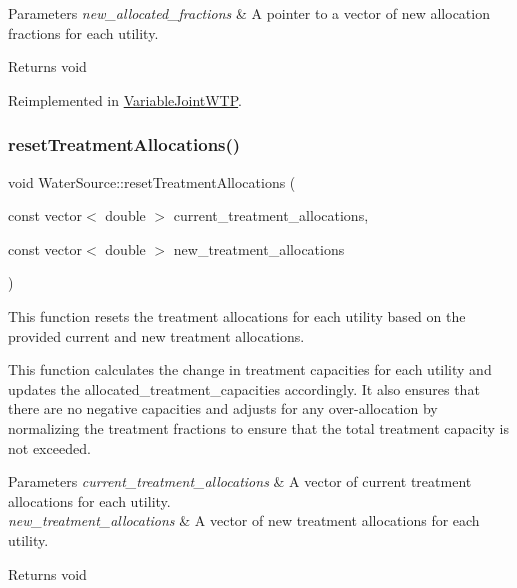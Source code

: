 \begin{DoxyParams}{Parameters}
{\em new\+\_\+allocated\+\_\+fractions} & A pointer to a vector of new allocation fractions for each utility.\\
\hline
\end{DoxyParams}
\begin{DoxyReturn}{Returns}
void 
\end{DoxyReturn}


Reimplemented in \mbox{\hyperlink{classVariableJointWTP_ab02c6701ad5120e189023b038bae13b7}{Variable\+Joint\+W\+TP}}.

\mbox{\label{classWaterSource_adfc85c196cfc262d4b463e87c459eb3f}} 
\subsubsection{\texorpdfstring{reset\+Treatment\+Allocations()}{resetTreatmentAllocations()}}
{\footnotesize\ttfamily void Water\+Source\+::reset\+Treatment\+Allocations (\begin{DoxyParamCaption}\item[{const vector$<$ double $>$}]{current\+\_\+treatment\+\_\+allocations,  }\item[{const vector$<$ double $>$}]{new\+\_\+treatment\+\_\+allocations }\end{DoxyParamCaption})}



This function resets the treatment allocations for each utility based on the provided current and new treatment allocations. 

This function calculates the change in treatment capacities for each utility and updates the {\ttfamily allocated\+\_\+treatment\+\_\+capacities} accordingly. It also ensures that there are no negative capacities and adjusts for any over-\/allocation by normalizing the treatment fractions to ensure that the total treatment capacity is not exceeded.


\begin{DoxyParams}{Parameters}
{\em current\+\_\+treatment\+\_\+allocations} & A vector of current treatment allocations for each utility. \\
\hline
{\em new\+\_\+treatment\+\_\+allocations} & A vector of new treatment allocations for each utility.\\
\hline
\end{DoxyParams}
\begin{DoxyReturn}{Returns}
void 
\end{DoxyReturn}
\mbox{\label{classWaterSource_ac834762e016e796968ad286feeca7be6}} 
